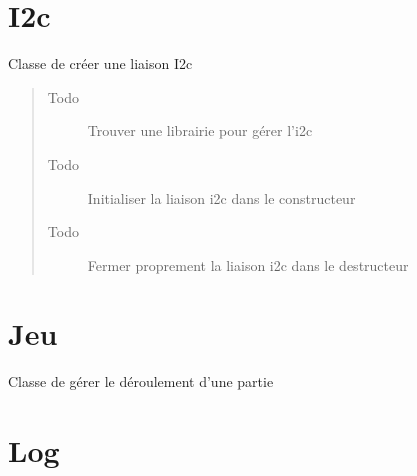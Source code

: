 \documentclass[letterpaper,10pt,french]{sphinxmanual}
\begin{document}
\chapter{I2c}
\label{i2c:i2c}\label{i2c::doc}\label{i2c:module-lib.i2c}

\begin{fulllineitems}
\label{i2c:lib.i2c.I2c}
Classe de créer une liaison I2c
\begin{quote}\begin{description}
\item[{Todo }] \leavevmode
Trouver une librairie pour gérer l'i2c

\item[{Todo }] \leavevmode
Initialiser la liaison i2c dans le constructeur

\item[{Todo }] \leavevmode
Fermer proprement la liaison i2c dans le destructeur

\end{description}\end{quote}

\end{fulllineitems}



\chapter{Jeu}
\label{jeu:module-lib.jeu}\label{jeu::doc}\label{jeu:jeu}

\begin{fulllineitems}
\label{jeu:lib.jeu.Jeu}
Classe de gérer le déroulement d'une partie

\end{fulllineitems}



\chapter{Log}
\label{log:module-lib.log}\label{log::doc}\label{log:log}
\end{document}

